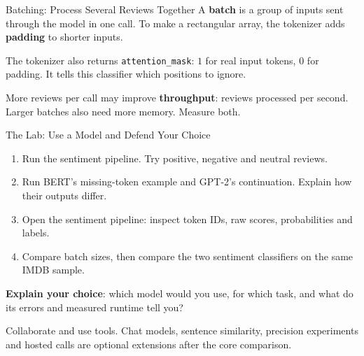\documentclass[aspectratio=169]{beamer}
\begin{document}
\begin{frame}{Batching: Process Several Reviews Together}
  \small A \textbf{batch} is a group of inputs sent through the model in one call. To make a rectangular array, the tokenizer adds \textbf{padding} to shorter inputs.
  \begin{center}
  \end{center}
  \small The tokenizer also returns \texttt{attention\_mask}: $1$ for real input tokens, $0$ for padding. It tells this classifier which positions to ignore.
  \par\vspace{0.4em}
  More reviews per call may improve \textbf{throughput}: reviews processed per second. Larger batches also need more memory. Measure both.
\end{frame}

\begin{frame}{The Lab: Use a Model and Defend Your Choice}
  \begin{enumerate}
    \item Run the sentiment pipeline. Try positive, negative and neutral reviews.
    \item Run BERT's missing-token example and GPT-2's continuation. Explain how their outputs differ.
    \item Open the sentiment pipeline: inspect token IDs, raw scores, probabilities and labels.
    \item Compare batch sizes, then compare the two sentiment classifiers on the same IMDB sample.
  \end{enumerate}
  \textbf{Explain your choice}: which model would you use, for which task, and what do its errors and measured runtime tell you?
  \par\vspace{0.5em}
  \small Collaborate and use tools. Chat models, sentence similarity, precision experiments and hosted calls are optional extensions after the core comparison.
\end{frame}
\end{document}

